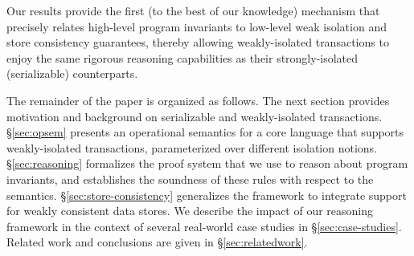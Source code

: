 \noindent Our results provide the first (to the best of our
knowledge) mechanism that precisely relates high-level program
invariants to low-level weak isolation and store consistency
guarantees, thereby allowing weakly-isolated transactions to enjoy the
same rigorous reasoning capabilities as their strongly-isolated
(serializable) counterparts.

The remainder of the paper is organized as follows.  The next section
provides motivation and background on serializable and weakly-isolated
transactions. \S\ref{sec:opsem} presents an operational semantics for
a core language that supports weakly-isolated transactions,
parameterized over different isolation notions. \S\ref{sec:reasoning}
formalizes the proof system that we use to reason about program
invariants, and establishes the soundness of these rules with respect
to the semantics. \S\ref{sec:store-consistency} generalizes the
framework to integrate support for weakly consistent data stores. We
describe the impact of our reasoning framework in the context of
several real-world case studies in \S\ref{sec:case-studies}.  Related
work and conclusions are given in \S\ref{sec:relatedwork}.
